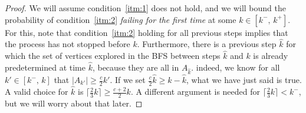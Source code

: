 \documentclass{amsart}
\theoremstyle{plain}
\theoremstyle{definition}
\begin{document}
    \begin{proof}
        \vspace{-3mm}
        We will assume condition~\ref{itm:1} does not hold, and we will bound the probability of
        condition~\ref{itm:2} \emph{failing for the first time} at some $k \in [k^{-}, \, k^{+}]$.
        For this, note that condition~\ref{itm:2} holding for all previous steps implies that
        the process has not stopped before $k$.
        Furthermore, there is a previous step $\hat{k}$ for which the set of vertices explored in the BFS
        between steps $\hat{k}$ and $k$ is already predetermined at time $\hat{k}$,
        because they are all in $A_{\hat{k}}$.
        indeed, we know for all $k' \in [k^{-}, \, k]$ that $|A_{k'}| \geq \frac{c}{2}k'$.
        If we set $\frac{c}{2}\hat{k} \geq k - \hat{k}$, what we have just said is true.
        A valid choice for $\hat{k}$ is $\lceil \frac{2}{3} k \rceil \geq \frac{c+2}{2}k$.
        A different argument is needed for  $\lceil \frac{2}{3} k \rceil < k^-$, but we
        will worry about that later.


\end{proof}
\end{document}
